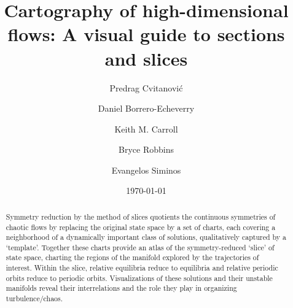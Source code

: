 \documentclass[aip,cha,reprint,
secnumarabic,
nofootinbib, tightenlines,
nobibnotes, showkeys, showpacs,
groupedaddress
]{revtex4-1}
\begin{document}
\title[High-dimensional cartography]
{Cartography of high-dimensional flows: A visual guide to sections and slices}


\author{Predrag Cvitanovi{\'c}}
\author{Daniel Borrero-Echeverry}
\author{Keith M. Carroll}
\author{Bryce Robbins}
\author{Evangelos Siminos}

\date{\today}

    \begin{abstract}
Symmetry reduction by the method of slices quotients the continuous
symmetries of chaotic flows by replacing the original state space by a
set of charts, each covering a neighborhood of a dynamically important
class of solutions, qualitatively captured by a `template'. Together
these charts provide an atlas of the symmetry-reduced `slice' of state
space, charting the regions of the manifold explored by the trajectories
of interest. Within the slice, relative equilibria reduce to equilibria
and relative periodic orbits reduce to periodic orbits. Visualizations of
these solutions and their unstable manifolds reveal their interrelations
and the role they play in organizing turbulence/chaos.
    \end{abstract}


\maketitle
\end{document}
